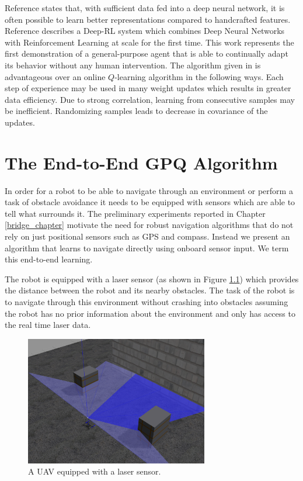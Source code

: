 \documentclass[12pt]{report}
\begin{document}
Reference \cite{krizhevsky2012imagenet} states that, with sufficient data fed into a deep neural network, it is often possible to learn better representations compared to handcrafted features. Reference \cite{mnih2015human} describes a Deep-RL system which combines Deep Neural Networks with Reinforcement Learning at scale for the first time. This work represents the first demonstration of a general-purpose agent that is able to continually adapt its behavior without any human intervention. 
The algorithm given in \cite{mnih2013playing} is advantageous over an online $Q$-learning algorithm in the following ways. Each step of experience may be used in many weight updates which results in greater data efficiency. Due to strong correlation, learning from consecutive samples may be inefficient. Randomizing samples leads to decrease in covariance of the updates.

\chapter{The End-to-End GPQ Algorithm} %

\label{gpq} %

In order for a robot to be able to navigate through an environment or perform a task of obstacle avoidance it needs to be equipped with sensors which are able to tell what surrounds it. The preliminary experiments reported in Chapter \ref{bridge_chapter} motivate the need for robust navigation algorithms that do not rely on just positional sensors such as GPS and compass. Instead we present an algorithm that learns to navigate directly using onboard sensor input. We term this end-to-end learning. \par 

The robot is equipped with a laser sensor (as shown in Figure \ref{fig:perception_example}) which provides the distance between the robot and its nearby obstacles. The task of the robot is to navigate through this environment without crashing into obstacles assuming the robot has no prior information about the environment and only has access to the real time laser data.
\begin{figure}[H]
	\centering
	\includegraphics[width=8cm]{perception_1.pdf}
	\caption {A UAV equipped with a laser sensor.}
   \label{fig:perception_example}
\end{figure}
\end{document}
